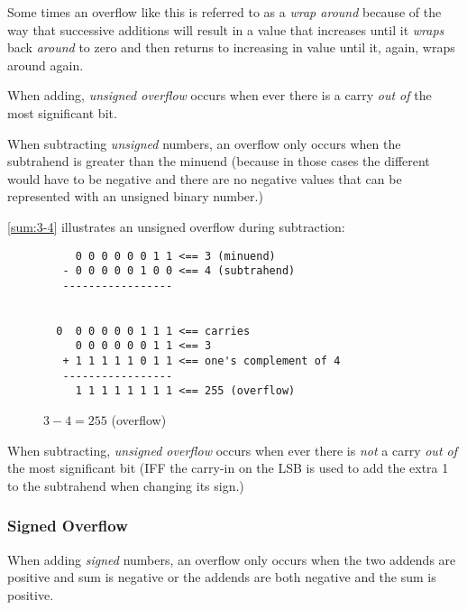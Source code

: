 Some times an overflow like this is referred to as a {\em wrap around}
because of the way that successive additions will result in a value that
increases until it {\em wraps} back {\em around} to zero and then 
returns to increasing in value until it, again, wraps around again.

\begin{tcolorbox}
When adding, {\em unsigned overflow} occurs when ever there is a carry
{\em out of} the most significant bit.
\end{tcolorbox}



When subtracting {\em unsigned} numbers, an overflow only occurs when the
subtrahend is greater than the minuend (because in those cases the 
different would have to be negative and there are no negative values 
that can be represented with an unsigned binary number.)

\autoref{sum:3-4} illustrates an unsigned overflow during subtraction:

\begin{figure}[H]
\centering
\begin{BVerbatim}
     0 0 0 0 0 0 1 1 <== 3 (minuend)
   - 0 0 0 0 0 1 0 0 <== 4 (subtrahend)
   -----------------


  0  0 0 0 0 0 1 1 1 <== carries
     0 0 0 0 0 0 1 1 <== 3
   + 1 1 1 1 1 0 1 1 <== one's complement of 4
   -----------------
     1 1 1 1 1 1 1 1 <== 255 (overflow)
\end{BVerbatim}
\caption{$3-4=255$ (overflow)}
\label{sum:3-4}
\end{figure}

\begin{tcolorbox}
When subtracting, {\em unsigned overflow} occurs when ever there is {\em not} a carry
{\em out of} the most significant bit (IFF the carry-in on the LSB is used to add the
extra 1 to the subtrahend when changing its sign.)
\end{tcolorbox}


\subsubsection{Signed Overflow}

When adding {\em signed} numbers, an overflow only occurs when the two 
addends are positive and sum is negative or the addends are both negative 
and the sum is positive.  


